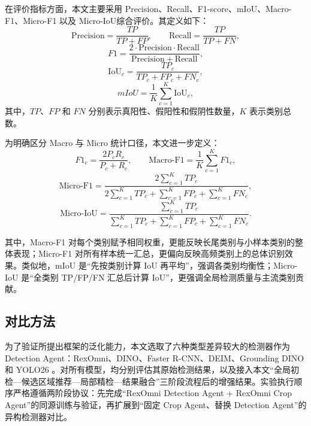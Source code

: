 在评价指标方面，本文主要采用 Precision、Recall、F1-score、mIoU、Macro-F1、Micro-F1 以及 Micro-IoU综合评价。其定义如下：
\begin{equation}
\mathrm{Precision}=\frac{TP}{TP+FP},
\qquad
\mathrm{Recall}=\frac{TP}{TP+FN},
\label{eq:precision_recall_exp}
\end{equation}
\begin{equation}
F1=\frac{2\cdot \mathrm{Precision}\cdot \mathrm{Recall}}
{\mathrm{Precision}+\mathrm{Recall}},
\label{eq:f1_exp}
\end{equation}
\begin{equation}
\mathrm{IoU}_c=\frac{TP_c}{TP_c+FP_c+FN_c},
\label{eq:iou_exp}
\end{equation}
\begin{equation}
mIoU=\frac{1}{K}\sum_{c=1}^{K}\mathrm{IoU}_c,
\label{eq:miou_exp}
\end{equation}
其中，$TP$、$FP$ 和 $FN$ 分别表示真阳性、假阳性和假阴性数量，$K$ 表示类别总数。

为明确区分 Macro 与 Micro 统计口径，本文进一步定义：
\begin{equation}
F1_c=\frac{2P_cR_c}{P_c+R_c},\qquad
\mathrm{Macro\text{-}F1}=\frac{1}{K}\sum_{c=1}^{K}F1_c,
\label{eq:macro_f1_exp}
\end{equation}
\begin{equation}
\mathrm{Micro\text{-}F1}
=\frac{2\sum_{c=1}^{K}TP_c}
{2\sum_{c=1}^{K}TP_c+\sum_{c=1}^{K}FP_c+\sum_{c=1}^{K}FN_c},
\label{eq:micro_f1_exp}
\end{equation}
\begin{equation}
\mathrm{Micro\text{-}IoU}
=\frac{\sum_{c=1}^{K}TP_c}
{\sum_{c=1}^{K}TP_c+\sum_{c=1}^{K}FP_c+\sum_{c=1}^{K}FN_c}.
\label{eq:micro_iou_exp}
\end{equation}

其中，Macro-F1 对每个类别赋予相同权重，更能反映长尾类别与小样本类别的整体表现；Micro-F1 对所有样本统一汇总，更偏向反映高频类别上的总体识别效果。类似地，mIoU 是“先按类别计算 IoU 再平均”，强调各类别均衡性；Micro-IoU 是“全类别 TP/FP/FN 汇总后计算 IoU”，更强调全局检测质量与主流类别贡献。

\subsection{对比方法}

为了验证所提出框架的泛化能力，本文选取了六种类型差异较大的检测器作为 Detection Agent：RexOmni、DINO、Faster R-CNN、DEIM、Grounding DINO 和 YOLO26 。对所有模型，均分别评估其原始检测结果，以及接入本文“全局初检—候选区域推荐—局部精检—结果融合”三阶段流程后的增强结果。实验执行顺序严格遵循两阶段协议：先完成“RexOmni Detection Agent + RexOmni Crop Agent”的同源训练与验证，再扩展到“固定 Crop Agent、替换 Detection Agent”的异构检测器对比。

